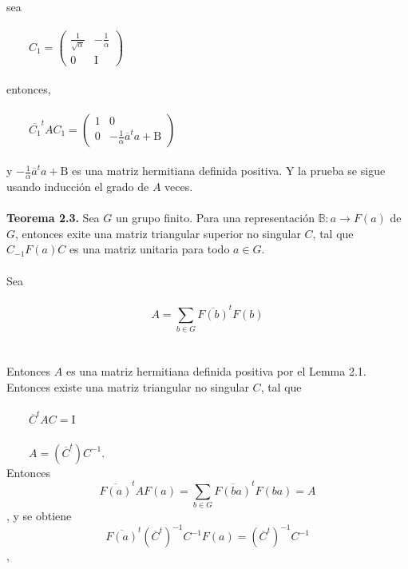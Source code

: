 \documentclass[12pt]{book}
\theoremstyle{definition}
\newcounter{in}
\newcounter{ini}
\begin{document}
sea\\~\\
$\qquad 
C_{1}=
\begin{pmatrix}
\frac{1}{\sqrt{\alpha}} & -\frac{1}{\alpha} \\ 
0 & \mathrm{I}
\end{pmatrix}$\\~\\
entonces, \\~\\
$\qquad 
\overline{C_{1}}^{t}AC_{1} =
\begin{pmatrix}
1 & 0 \\ 
0 & -\frac{1}{\alpha}\overline{a}^{t}a+\mathrm{B}
\end{pmatrix}$\\~\\
y $-\frac{1}{\alpha}\overline{a}^{t}a+\mathrm{B}$ es una matriz hermitiana definida positiva. Y la prueba se sigue usando inducción el grado de $A$ veces.\\~\\
\textbf{Teorema 2.3.} Sea $G$ un grupo finito. Para una representación $\mathbb{B}: a\rightarrow F\left(a\right)$ de $G$, entonces exite una matriz triangular superior no singular $C$, tal que $C_{-1}F\left(a\right)C$ es una matriz unitaria para todo $a \in G$.\\~\\
Sea\\~\\
\begin{equation*}
A=\sum_{b \in G} \overline{F\left(b\right)}^{t}F\left(b\right)
\end{equation*}
\\~\\
Entonces $A$ es una matriz hermitiana definida positiva por el Lemma 2.1. Entonces existe una matriz triangular no singular $C$, tal que\\~\\
$\qquad \overline{C}^{t}AC= \mathrm{I}$\\~\\
$\qquad A=\left(\overline{C}^{t}\right)C^{-1}$.\\
Entonces
\begin{equation*}
\overline{F\left(a\right)}^{t}AF\left(a\right)=\sum_{b \in G} \overline{F\left(ba\right)}^{t}F\left(ba\right)=A
\end{equation*},
y se obtiene
\begin{equation*}
\overline{F\left(a\right)}^{t}(\overline{C}^{t})^{-1}C^{-1}F\left(a\right)=(\overline{C}^{t})^{-1}C^{-1}
\end{equation*},
\end{document}

